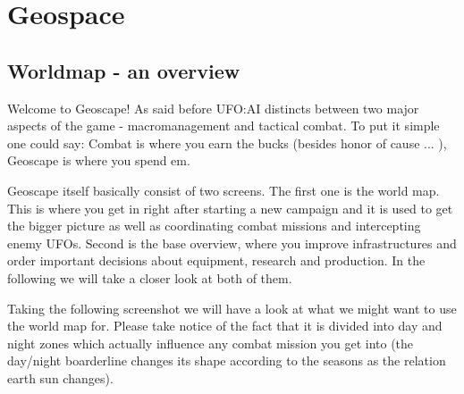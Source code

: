 
%
%


\section{Geospace}

\subsection{Worldmap - an overview} 
Welcome to Geoscape! As said before UFO:AI distincts between two major aspects of the game - macromanagement and tactical combat. To put it simple one could say: Combat is where you earn the bucks (besides honor of cause ... ), Geoscape is where you spend em.

Geoscape itself basically consist of two screens. The first one is the world map. This is where you get in right after starting a new campaign and it is used to get the bigger picture as well as coordinating combat missions and intercepting enemy UFOs. Second is the base overview, where you improve infrastructures and order important decisions about equipment, research and production. In the following we will take a closer look at both of them.

Taking the following screenshot we will have a look at what we might want to use the world map for.
Please take notice of the fact that it is divided into day and night zones which actually influence any combat mission you get into (the day/night boarderline changes its shape according to the seasons as the relation earth \leftrightharpoons sun changes).\\

